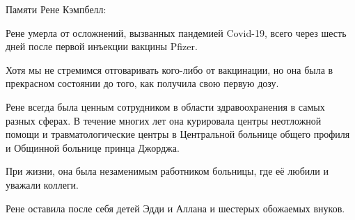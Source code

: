 Памяти Рене Кэмпбелл:

Рене умерла от осложнений, вызванных пандемией Covid-19, всего через шесть дней
после первой инъекции вакцины Pfizer.

Хотя мы не стремимся отговаривать кого-либо от вакцинации, но она была в
прекрасном состоянии до того, как получила свою первую дозу.

Рене всегда была ценным сотрудником в области здравоохранения в самых разных
сферах. В течение многих лет она курировала центры неотложной помощи и
травматологические центры в Центральной больнице общего профиля и Общинной
больнице принца Джорджа.

При жизни, она была незаменимым работником больницы, где её любили и уважали
коллеги.

Рене оставила после себя детей Эдди и Аллана и шестерых обожаемых внуков.
